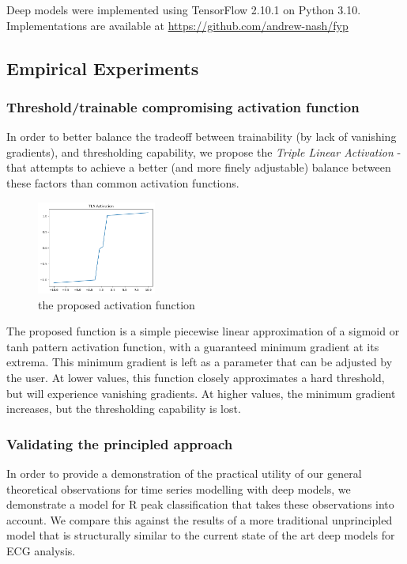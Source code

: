 \documentclass[9pt,conference]{IEEEtran}
\begin{document}
Deep models were implemented using TensorFlow 2.10.1 on Python 3.10. Implementations are available at \url{https://github.com/andrew-nash/fyp}

\subsection{Empirical Experiments}
\subsubsection{Threshold/trainable compromising activation function}
In order to better balance the tradeoff between trainability (by lack of vanishing gradients), and thresholding capability, we propose the \textit{Triple Linear Activation} - that attempts to achieve a better (and more finely adjustable) balance between these factors than common activation functions.

\begin{figure}
    \centering
    \includegraphics[width=0.35\textwidth]{tlaAct.png}
    \caption{the proposed activation function}
\end{figure}

The proposed function is a simple piecewise linear approximation of a sigmoid or tanh pattern activation function, with a guaranteed minimum gradient at its extrema. This minimum gradient is left as a parameter that can be adjusted by the user. At lower values, this function closely approximates a hard threshold, but will experience vanishing gradients. At higher values,  the minimum gradient increases, but the thresholding capability is lost.

\subsubsection{Validating the principled approach}
In order to provide a demonstration of the practical utility of our general theoretical observations for time series modelling with deep models, we demonstrate a model for R peak classification that takes these observations into account. We compare this against the results of a more traditional unprincipled model that is structurally similar to the current state of the art deep models for ECG analysis.
\end{document}
